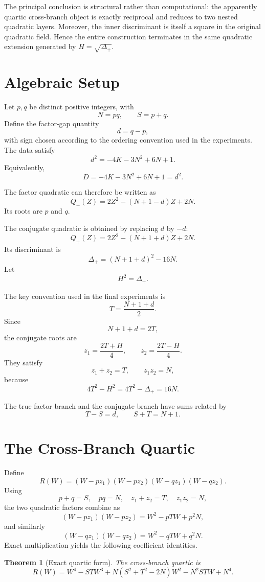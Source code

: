 \documentclass[11pt,a4paper]{article}
\newtheorem{theorem}{Theorem}[section]
\theoremstyle{definition}
\theoremstyle{remark}
\begin{document}
The principal conclusion is structural rather than computational: the apparently quartic cross-branch object is exactly reciprocal and reduces to two nested quadratic layers. Moreover, the inner discriminant is itself a square in the original quadratic field. Hence the entire construction terminates in the same quadratic extension generated by $H=\sqrt{\Delta_+}$.

\section{Algebraic Setup}

Let $p,q$ be distinct positive integers, with
\[
N=pq,
\qquad
S=p+q.
\]
Define the factor-gap quantity
\[
d=q-p,
\]
with sign chosen according to the ordering convention used in the experiments. The data satisfy
\[
d^2=-4K-3N^2+6N+1.
\]
Equivalently,
\[
D=-4K-3N^2+6N+1=d^2.
\]

The factor quadratic can therefore be written as
\[
Q_-(Z)=2Z^2-(N+1-d)Z+2N.
\]
Its roots are $p$ and $q$.

The conjugate quadratic is obtained by replacing $d$ by $-d$:
\[
Q_+(Z)=2Z^2-(N+1+d)Z+2N.
\]
Its discriminant is
\[
\Delta_+=(N+1+d)^2-16N.
\]
Let
\[
H^2=\Delta_+.
\]

The key convention used in the final experiments is
\[
T=\frac{N+1+d}{2}.
\]
Since
\[
N+1+d=2T,
\]
the conjugate roots are
\[
\boxed{z_1=\frac{2T+H}{4},\qquad z_2=\frac{2T-H}{4}.}
\]
They satisfy
\[
z_1+z_2=T,
\qquad
z_1z_2=N,
\]
because
\[
4T^2-H^2=4T^2-\Delta_+=16N.
\]

The true factor branch and the conjugate branch have sums related by
\[
T-S=d,
\qquad
S+T=N+1.
\]

\section{The Cross-Branch Quartic}

Define
\[
R(W)=(W-pz_1)(W-pz_2)(W-qz_1)(W-qz_2).
\]
Using
\[
p+q=S,\quad pq=N,\quad z_1+z_2=T,\quad z_1z_2=N,
\]
the two quadratic factors combine as
\[
(W-pz_1)(W-pz_2)
=W^2-pTW+p^2N,
\]
and similarly
\[
(W-qz_1)(W-qz_2)
=W^2-qTW+q^2N.
\]
Exact multiplication yields the following coefficient identities.

\begin{theorem}[Exact quartic form]
The cross-branch quartic is
\[
\boxed{
R(W)=W^4-STW^3+N(S^2+T^2-2N)W^2-N^2STW+N^4.
}
\]
\end{theorem}
\end{document}
